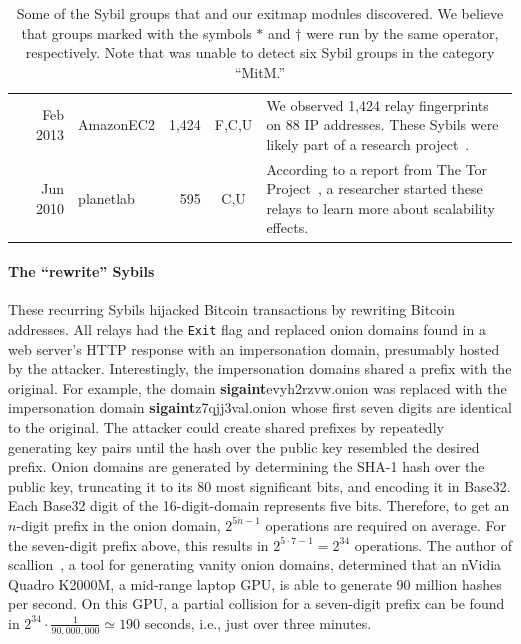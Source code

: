 \begin{table}[ht!]
\begin{tabularx}{\textwidth}{l r l r c X}
& Feb 2013 & AmazonEC2 & 1,424 & \phantom{N,}F,C,U\phantom{,E} & We observed 1,424 relay fingerprints on
88 IP addresses.  These Sybils were likely part of a research
project~\cite{Biryukov2013a}. \\

& Jun 2010 & planetlab & 595 & \phantom{N,F,}C,U\phantom{,E} & According to a report from The Tor
Project~\cite{progressreport}, a researcher started these relays to learn more
about scalability effects. \\

\bottomrule

\end{tabularx}
\caption{Some of the Sybil groups that \sys and our exitmap modules discovered.
We believe that groups marked with the symbols $*$ and $\dagger$ were run by
the same operator, respectively.  Note that \sys was unable to detect six Sybil
groups in the category ``MitM.''}
\label{tab:sybils}
\end{table}

\paragraph{The ``rewrite'' Sybils}
These recurring Sybils hijacked Bitcoin transactions by rewriting Bitcoin
addresses.  All relays had the \texttt{Exit} flag and replaced onion domains
found in a web server's HTTP response with an impersonation domain, presumably
hosted by the attacker.  Interestingly, the impersonation domains shared a
prefix with the original.  For example, the domain
\textbf{sigaint}evyh2rzvw.onion was replaced with the impersonation domain
\textbf{sigaint}z7qjj3val.onion whose first seven digits are identical to the
original.  The attacker could create shared prefixes by repeatedly generating
key pairs until the hash over the public key resembled the desired prefix.
Onion domains are generated by determining the SHA-1 hash over the public key,
truncating it to its 80 most significant bits, and encoding it in Base32.  Each
Base32 digit of the 16-digit-domain represents five bits.  Therefore, to get an
$n$-digit prefix in the onion domain, $2^{5 n - 1}$ operations are required on
average.  For the seven-digit prefix above, this results in $2^{5 \cdot 7 - 1}
= 2^{34}$ operations.  The author of scallion~\cite{scallion}, a tool for
generating vanity onion domains, determined that an nVidia Quadro K2000M, a
mid-range laptop GPU, is able to generate 90 million hashes per second.  On
this GPU, a partial collision for a seven-digit prefix can be found in $2^{34}
\cdot \frac{1}{90,000,000} \simeq 190$ seconds, i.e., just over three minutes.

